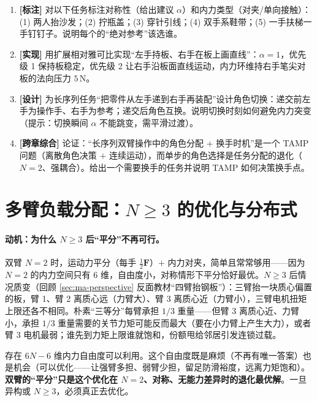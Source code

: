 \begin{exercise}
\begin{enumerate}
  \item \textbf{[标注]} 对以下任务标注对称性（给出建议 $\alpha$）和内力类型（对夹/单向接触）：(1) 两人抬沙发；(2) 拧瓶盖；(3) 穿针引线；(4) 双手系鞋带；(5) 一手扶梯一手钉钉子。说明每个的“绝对参考”该选谁。
  \item \textbf{[实现]} 用扩展相对雅可比实现“左手持板、右手在板上画直线”：$\alpha=1$，优先级 1 保持板稳定，优先级 2 让右手沿板面直线运动，内力环维持右手笔尖对板的法向压力 $5$\,N。
  \item \textbf{[设计]} 为长序列任务“把零件从左手递到右手再装配”设计角色切换：递交前左手为操作手、右手为参考；递交后角色互换。说明切换时刻如何避免内力突变（提示：切换瞬间 $\alpha$ 不能跳变，需平滑过渡）。
  \item \textbf{[跨章综合]} 论证：“长序列双臂操作中的角色分配 $+$ 换手时机”是一个 TAMP 问题（离散角色决策 $+$ 连续运动），而单步的角色选择是任务分配的退化（$N=2$、强耦合）。给出一个需要换手的任务并说明 TAMP 如何决策换手点。
\end{enumerate}
\end{exercise}

\section{多臂负载分配：$N\ge 3$ 的优化与分布式}
\label{sec:ma-allocation}

\paragraph{动机：为什么 $N\ge 3$ 后“平分”不再可行。}
双臂 $N=2$ 时，运动力平分（每手 $\tfrac12\mathbf{F}$）$+$ 内力对夹，简单且常常够用——因为 $N=2$ 的内力空间只有 $6$ 维，自由度小，对称情形下平分恰好最优。$N\ge3$ 后情况质变（回顾 \cref{sec:ma-perspective} 反面教材“四臂抬钢板”）：三臂抬一块质心偏置的板，臂 1、臂 2 离质心远（力臂大）、臂 3 离质心近（力臂小），三臂电机扭矩上限还各不相同。朴素“三等分”每臂承担 $1/3$ 重量——但臂 3 离质心近、力臂小，承担 $1/3$ 重量需要的关节力矩可能反而最大（要在小力臂上产生大力），或者臂 3 电机最弱；谁先到力矩上限谁就饱和，份额甩给邻居引发连锁过载。

\begin{insight}
存在 $6N-6$ 维内力自由度可以利用。这个自由度既是麻烦（不再有唯一答案）也是机会（可以优化——让强臂多担、弱臂少担，留足防滑裕度，远离力矩饱和）。\textbf{双臂的“平分”只是这个优化在 $N=2$、对称、无能力差异时的退化最优解}。一旦异构或 $N\ge3$，必须真正去优化。
\end{insight}

